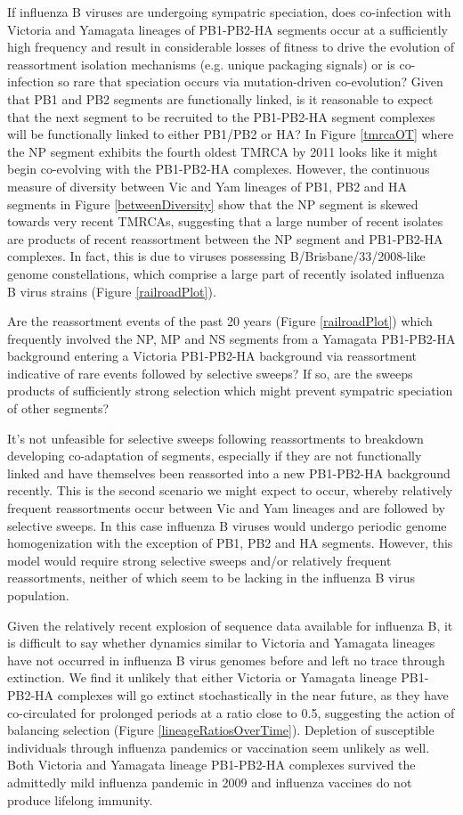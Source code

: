 \documentclass[11pt,oneside,letterpaper]{article}
\begin{document}
If influenza B viruses are undergoing sympatric speciation, does co-infection with Victoria and Yamagata lineages of PB1-PB2-HA segments occur at a sufficiently high frequency and result in considerable losses of fitness to drive the evolution of reassortment isolation mechanisms (e.g. unique packaging signals) or is co-infection so rare that speciation occurs via mutation-driven co-evolution?
Given that PB1 and PB2 segments are functionally linked, is it reasonable to expect that the next segment to be recruited to the PB1-PB2-HA segment complexes will be functionally linked to either PB1/PB2 or HA?
In Figure \ref{tmrcaOT} where the NP segment exhibits the fourth oldest TMRCA by 2011 looks like it might begin co-evolving with the PB1-PB2-HA complexes. 
However, the continuous measure of diversity between Vic and Yam lineages of PB1, PB2 and HA segments in Figure \ref{betweenDiversity} show that the NP segment is skewed towards very recent TMRCAs, suggesting that a large number of recent isolates are products of recent reassortment between the NP segment and PB1-PB2-HA complexes.
In fact, this is due to viruses possessing B/Brisbane/33/2008-like genome constellations, which comprise a large part of recently isolated influenza B virus strains (Figure \ref{railroadPlot}).

Are the reassortment events of the past 20 years (Figure \ref{railroadPlot}) which frequently involved the NP, MP and NS segments from a Yamagata PB1-PB2-HA background entering a Victoria PB1-PB2-HA background via reassortment indicative of rare events followed by selective sweeps?
If so, are the sweeps products of sufficiently strong selection which might prevent sympatric speciation of other segments?

It's not unfeasible for selective sweeps following reassortments to breakdown developing co-adaptation of segments, especially if they are not functionally linked and have themselves been reassorted into a new PB1-PB2-HA background recently.
This is the second scenario we might expect to occur, whereby relatively frequent reassortments occur between Vic and Yam lineages and are followed by selective sweeps.
In this case influenza B viruses would undergo periodic genome homogenization with the exception of PB1, PB2 and HA segments.
However, this model would require strong selective sweeps and/or relatively frequent reassortments, neither of which seem to be lacking in the influenza B virus population.

Given the relatively recent explosion of sequence data available for influenza B, it is difficult to say whether dynamics similar to Victoria and Yamagata lineages have not occurred in influenza B virus genomes before and left no trace through extinction.
We find it unlikely that either Victoria or Yamagata lineage PB1-PB2-HA complexes will go extinct stochastically in the near future, as they have co-circulated for prolonged periods at a ratio close to 0.5, suggesting the action of balancing selection (Figure \ref{lineageRatiosOverTime}).
Depletion of susceptible individuals through influenza pandemics or vaccination seem unlikely as well.
Both Victoria and Yamagata lineage PB1-PB2-HA complexes survived the admittedly mild influenza pandemic in 2009 and influenza vaccines do not produce lifelong immunity.
\end{document}
